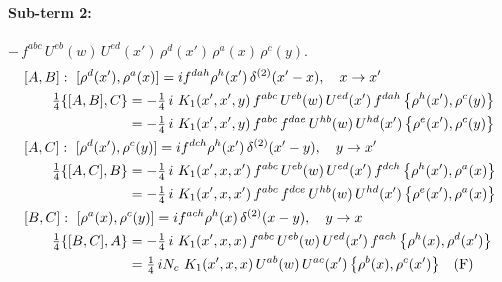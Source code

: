 \documentclass[10pt]{article}
\numberwithin{equation}{section}
\begin{document}
\paragraph{Sub-term 2:} $-\,f^{abc}\,U^{eb}(w)\,U^{ed}(x')\,\rho^{d}(x')\,\rho^{a}(x)\,\rho^{c}(y)$.
\begin{align}
&[A,B]:\ [\rho^{d}(x'),\rho^{a}(x)]=i f^{dah}\rho^{h}(x')\,\delta^{(2)}(x'-x),\quad x\to x'\notag\\
&\qquad \tfrac14\{[A,B],C\}=-\tfrac14\,i\,\,K_1(x',x',y)\,f^{abc}\,U^{eb}(w)\,U^{ed}(x')\,f^{dah}\,\big\{\rho^{h}(x'),\rho^{c}(y)\big\}\notag\\
&\qquad\phantom{\tfrac14\{[A,B],C\}}=-\tfrac14\,i\,\,K_1(x',x',y)\,f^{abc}\,f^{dae}\,U^{hb}(w)\,U^{hd}(x')\,\big\{\rho^{e}(x'),\rho^{c}(y)\big\}
\label{R:eq:A1-2-AB}\\
&[A,C]:\ [\rho^{d}(x'),\rho^{c}(y)]=i f^{dch}\rho^{h}(x')\,\delta^{(2)}(x'-y),\quad y\to x'\notag\\
&\qquad \tfrac14\{[A,C],B\}=-\tfrac14\,i\,\,K_1(x',x,x')\,f^{abc}\,U^{eb}(w)\,U^{ed}(x')\,f^{dch}\,\big\{\rho^{h}(x'),\rho^{a}(x)\big\}\notag\\
&\qquad\phantom{\tfrac14\{[A,C],B\}}=-\tfrac14\,i\,\,K_1(x',x,x')\,f^{abc}\,f^{dce}\,U^{hb}(w)\,U^{hd}(x')\,\big\{\rho^{e}(x'),\rho^{a}(x)\big\}
\label{R:eq:A1-2-AC}\\
&[B,C]:\ [\rho^{a}(x),\rho^{c}(y)]=i f^{ach}\rho^{h}(x)\,\delta^{(2)}(x-y),\quad y\to x\notag\\
&\qquad \tfrac14\{[B,C],A\}=-\tfrac14\,i\,\,K_1(x',x,x)\,f^{abc}\,U^{eb}(w)\,U^{ed}(x')\,f^{ach}\,\big\{\rho^{h}(x),\rho^{d}(x')\big\}\notag\\
&\qquad\phantom{\tfrac14\{[B,C],A\}}=\tfrac14\,i N_{c}\,\,K_1(x',x,x)\,U^{ab}(w)\,U^{ac}(x')\,\big\{\rho^{b}(x),\rho^{c}(x')\big\}\quad\text{(F)}
\label{R:eq:A1-2-BC}
\end{align}
\end{document}
